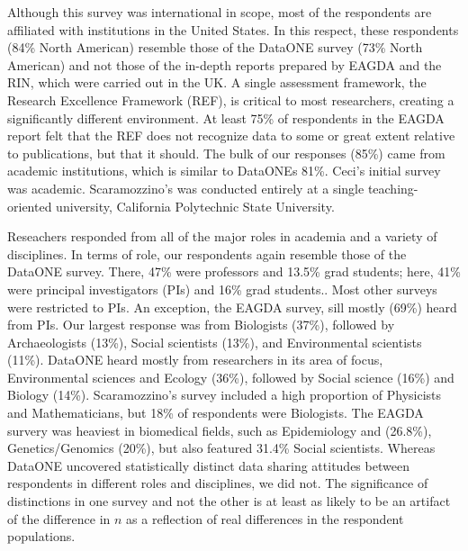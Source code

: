 \documentclass[10pt]{article}
\begin{document}
Although this survey was international in scope, most of the respondents are affiliated with institutions in the United States.
In this respect, these respondents (84\% North American) resemble those of the DataONE survey\cite{tenopir_data_2011} (73\% North American) and not those of the in-depth reports prepared by EAGDA\cite{bobrow_establishing_2014} and the RIN\cite{swan_share_2008}, which were carried out in the UK.
A single assessment framework, the Research Excellence Framework (REF), is critical to most researchers, creating a significantly different environment.
At least 75\% of respondents in the EAGDA report felt that the REF does not recognize data to some or great extent relative to publications, but that it should\cite{bobrow_establishing_2014}.
The bulk of our responses (85\%) came from academic institutions, which is similar to DataONEs 81\%\cite{tenopir_data_2011}.  
Ceci's initial survey was academic\cite{ceci_scientists_1988}.
Scaramozzino's was conducted entirely at a single teaching-oriented university, California Polytechnic State University\cite{scaramozzino_study_2012}. 

Reseachers responded from all of the major roles in academia and a variety of disciplines.
In terms of role, our respondents again resemble those of the DataONE survey.
There, 47\% were professors and 13.5\% grad students; here, 41\% were principal investigators (PIs) and 16\% grad students\cite{tenopir_data_2011}..
Most other surveys were restricted to PIs.
An exception, the EAGDA survey, sill mostly (69\%) heard from PIs\cite{bobrow_establishing_2014}.
Our largest response was from Biologists (37\%), followed by Archaeologists (13\%), Social scientists (13\%), and Environmental scientists (11\%). 
DataONE heard mostly from researchers in its area of focus, Environmental sciences and Ecology (36\%), followed by Social science (16\%) and Biology (14\%)\cite{tenopir_data_2011}. 
Scaramozzino's survey included a high proportion of Physicists and Mathematicians, but 18\% of respondents were Biologists\cite{scaramozzino_study_2012}.
The EAGDA survery was heaviest in biomedical fields, such as Epidemiology and (26.8\%), Genetics/Genomics (20\%), but also featured 31.4\% Social scientists\cite{bobrow_establishing_2014}. 
Whereas DataONE uncovered statistically distinct data sharing attitudes between respondents in different roles and disciplines, we did not.
The significance of distinctions in one survey and not the other is at least as likely to be an artifact of the difference in $n$ as a reflection of real differences in the respondent populations.
\end{document}
